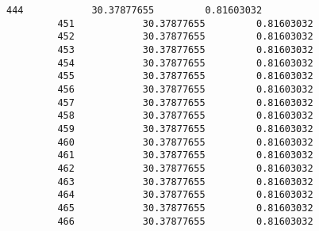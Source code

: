 \documentclass[11pt]{article}
\begin{document}
\begin{Verbatim}[commandchars=\\\{\}]
         444            30.37877655         0.81603032   
         451            30.37877655         0.81603032   
         452            30.37877655         0.81603032   
         453            30.37877655         0.81603032   
         454            30.37877655         0.81603032   
         455            30.37877655         0.81603032   
         456            30.37877655         0.81603032   
         457            30.37877655         0.81603032   
         458            30.37877655         0.81603032   
         459            30.37877655         0.81603032   
         460            30.37877655         0.81603032   
         461            30.37877655         0.81603032   
         462            30.37877655         0.81603032   
         463            30.37877655         0.81603032   
         464            30.37877655         0.81603032   
         465            30.37877655         0.81603032   
         466            30.37877655         0.81603032   
         

\end{Verbatim}
\end{document}
